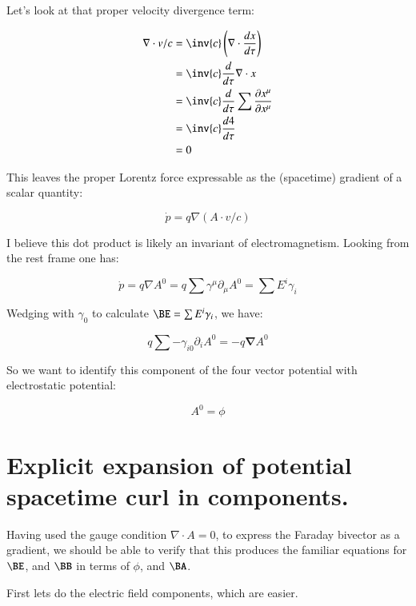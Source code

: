 \documentclass{article}
\newcommand{\grad}[0] {\nabla}
\newcommand{\spacegrad}[0]{\boldsymbol{\nabla}}
\begin{document}
Let's look at that proper velocity divergence term:

\begin{align*}
\grad \cdot v/c
&= \inv{c} \left(\grad \cdot \frac{dx}{d\tau}\right) \\
&= \inv{c} \frac{d}{d\tau} \grad \cdot x \\
&= \inv{c} \frac{d}{d\tau} \sum \frac{\partial x^{\mu}}{\partial x^{\mu}} \\
&= \inv{c} \frac{d 4}{d\tau} \\
&= 0
\end{align*}

This leaves the proper Lorentz force expressable as the (spacetime) gradient of a scalar quantity:

\begin{equation}
\dot{p} = q \grad (A \cdot v/c)
\end{equation}

I believe this dot product is likely an invariant of electromagnetism.  Looking from the rest frame one has:

\begin{equation}
\dot{p} = q \grad A^0 = q \sum \gamma^{\mu} \partial_{\mu} A^0 = \sum E^i \gamma_i
\end{equation}

Wedging with $\gamma_0$ to calculate $\BE = \sum E^i \gamma_i$, we have:

\begin{equation*}
q \sum -\gamma_{i0} \partial_{i} A^0 = - q \spacegrad A^0
\end{equation*}

So we want to identify this component of the four vector potential with electrostatic potential:

\begin{equation}
A^0 = \phi
\end{equation}

\section{ Explicit expansion of potential spacetime curl in components. }

Having used the gauge condition $\grad \cdot A = 0$, to express the Faraday bivector as a gradient, we should be able to
verify that this produces the familiar equations for $\BE$, and $\BB$ in terms of $\phi$, and $\BA$.

First lets do the electric field components, which are easier.
\end{document}
